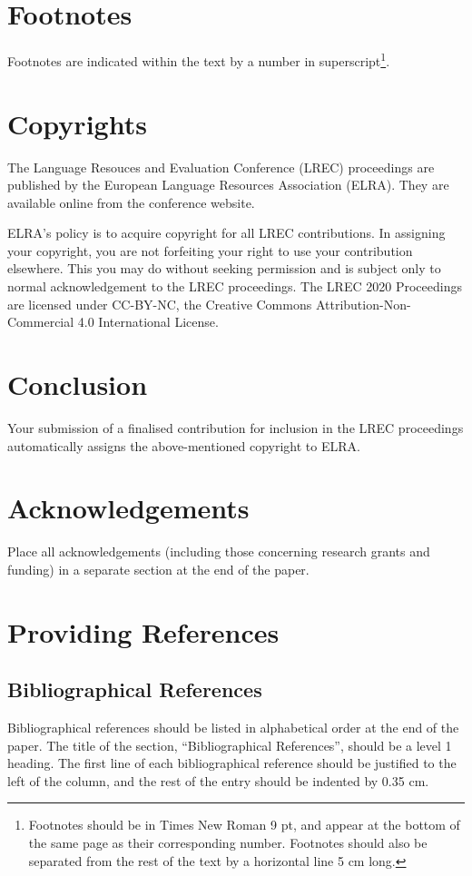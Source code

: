 \documentclass{article}
\begin{document}
\section{Footnotes}

Footnotes are indicated within the text by a number in
superscript\footnote{Footnotes should be in Times New Roman 9 pt, and appear at
the bottom of the same page as their corresponding number. Footnotes should also
be separated from the rest of the text by a horizontal line 5 cm long.}.

\section{Copyrights}

The Language Resouces and Evaluation Conference (LREC)
proceedings are published by the European Language Resources Association (ELRA).
They are available online from the conference website.


ELRA's policy is to acquire copyright for all LREC contributions. In assigning
your copyright, you are not forfeiting your right to use your contribution
elsewhere. This you may do without seeking permission and is subject only to
normal acknowledgement to the LREC proceedings. The LREC 2020 Proceedings are
licensed under CC-BY-NC, the Creative Commons Attribution-Non-Commercial 4.0
International License.

\section{Conclusion}

Your submission of a finalised contribution for inclusion in the LREC
proceedings automatically assigns the above-mentioned copyright to ELRA.

\section{Acknowledgements}

Place all acknowledgements (including those concerning research grants and
funding) in a separate section at the end of the paper.

\section{Providing References}

\subsection{Bibliographical References} 
Bibliographical references should be listed in alphabetical order at the
end of the paper. The title of the section, ``Bibliographical References'',
should be a level 1 heading. The first line of each bibliographical reference
should be justified to the left of the column, and the rest of the entry should
be indented by 0.35 cm.
\end{document}
